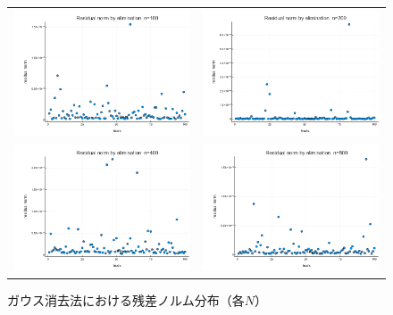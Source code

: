 \documentclass[a4paper,11pt]{ltjsarticle}
\begin{document}
\begin{figure}[H]
  \centering
  \begin{tabular}{cc}
    \includegraphics[width=72mm]{graphs/exp1_n100_residual.png} &
    \includegraphics[width=72mm]{graphs/exp1_n200_residual.png} \\
    \includegraphics[width=72mm]{graphs/exp1_n400_residual.png} &
    \includegraphics[width=72mm]{graphs/exp1_n800_residual.png} \\
    \end{tabular}
    \caption{ガウス消去法における残差ノルム分布（各$N$）}
    \label{fig:exp1_residuals}
    \end{figure}
\end{document}
